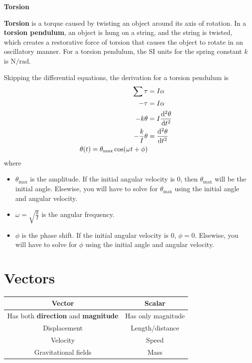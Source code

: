 \documentclass[a4paper, titlepage]{book}
\begin{document}
\textbf{Torsion}

\textbf{Torsion} is a torque caused by twisting an object around its axis of rotation.
In a \textbf{torsion pendulum}, an object is hung on a string,
and the string is twisted,
which creates a restorative force of torsion
that causes the object to rotate in an oscillatory manner.
For a torsion pendulum,
the SI units for the spring constant \(k\) is \(\unit{\newton \per \radian}\).

Skipping the differential equations, the derivation for a torsion pendulum is
\begin{equation}
    \begin{aligned}
        \sum \tau &= I \alpha \\
        - \tau &= I \alpha \\
        - k \theta &= I \odv[2]{\theta}{t} \\
        - \frac{k}{I} \theta &= \odv[2]{\theta}{t} \\
        \theta(t) = \theta_\mathrm{max} \cos(\omega t + \phi)
    \end{aligned}
\end{equation}
where
\begin{itemize}
    \item
        \(\theta_\mathrm{max}\) is the amplitude.
        If the initial angular velocity is 0,
        then \(\theta_\mathrm{max}\) will be the initial angle.
        Elsewise, you will have to solve for \(\theta_\mathrm{max}\)
        using the initial angle and angular velocity.
    \item \(\omega = \sqrt{\frac{k}{I}}\) is the angular frequency.
    \item
        \(\phi\) is the phase shift.
        If the initial angular velocity is 0, \(\phi = 0\).
        Elsewise, you will have to solve for \(\phi\)
        using the initial angle and angular velocity.
\end{itemize}


\appendix


\chapter{Vectors} \label{ch:vectors}

\begin{center}
    \begin{tabular}{ c|c }
    \textbf{Vector}                                    & \textbf{Scalar} \\
    \hline
    Has both \textbf{direction} and \textbf{magnitude} & Has only magnitude \\
    Displacement                                       & Length/distance \\
    Velocity                                           & Speed \\
    Gravitational fields                               & Mass
    \end{tabular}
\end{center}
\end{document}
